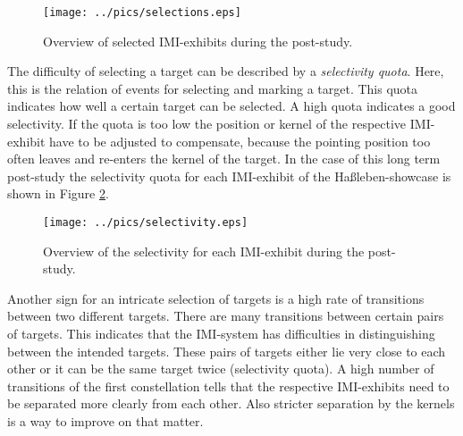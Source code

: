 
\begin{figure}[H]%
\texttt{[image: ../pics/selections.eps]}%
\caption{Overview of selected \ac{IMI}-exhibits during the post-study.}%
\label{fig:post-study_selections} %
\end{figure}

The difficulty of selecting a target can be described by a \textit{selectivity quota}. Here, this is the relation of events for selecting and marking a target. This quota indicates how well a certain target can be selected. A high quota indicates a good selectivity. If the quota is too low the position or kernel of the respective \ac{IMI}-exhibit have to be adjusted to compensate, because the pointing position too often leaves and re-enters the kernel of the target. In the case of this long term post-study the selectivity quota for each \ac{IMI}-exhibit of the Haßleben-showcase is shown in Figure \ref{fig:post-study_selectivity}.
\begin{figure}[H]%
\texttt{[image: ../pics/selectivity.eps]}%
\caption{Overview of the selectivity for each \ac{IMI}-exhibit during the post-study.}
\label{fig:post-study_selectivity} %
\end{figure}

Another sign for an intricate selection of targets is a high rate of transitions between two different targets. There are many transitions between certain pairs of targets. This indicates that the \ac{IMI}-system has difficulties in distinguishing between the intended targets. These pairs of targets either lie very close to each other or it can be the same target twice (selectivity quota). A high number of transitions of the first constellation tells that the respective \ac{IMI}-exhibits need to be separated more clearly from each other. Also stricter separation by the kernels is a way to improve on that matter.

